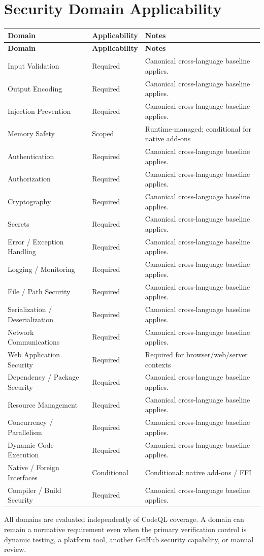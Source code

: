 \documentclass[10pt,letterpaper]{article}
\begin{document}
\section{Security Domain Applicability}
\small
\setlength{\tabcolsep}{3pt}
\begin{longtable}{@{}P{1.8in}P{0.85in}P{3.75in}@{}}
\toprule
\textbf{Domain} & \textbf{Applicability} & \textbf{Notes}\\
\midrule
\endfirsthead
\toprule
\textbf{Domain} & \textbf{Applicability} & \textbf{Notes}\\
\midrule
\endhead
Input Validation & Required & Canonical cross-language baseline applies.\\
Output Encoding & Required & Canonical cross-language baseline applies.\\
Injection Prevention & Required & Canonical cross-language baseline applies.\\
Memory Safety & Scoped & Runtime-managed; conditional for native add-ons\\
Authentication & Required & Canonical cross-language baseline applies.\\
Authorization & Required & Canonical cross-language baseline applies.\\
Cryptography & Required & Canonical cross-language baseline applies.\\
Secrets & Required & Canonical cross-language baseline applies.\\
Error / Exception Handling & Required & Canonical cross-language baseline applies.\\
Logging / Monitoring & Required & Canonical cross-language baseline applies.\\
File / Path Security & Required & Canonical cross-language baseline applies.\\
Serialization / Deserialization & Required & Canonical cross-language baseline applies.\\
Network Communications & Required & Canonical cross-language baseline applies.\\
Web Application Security & Required & Required for browser/web/server contexts\\
Dependency / Package Security & Required & Canonical cross-language baseline applies.\\
Resource Management & Required & Canonical cross-language baseline applies.\\
Concurrency / Parallelism & Required & Canonical cross-language baseline applies.\\
Dynamic Code Execution & Required & Canonical cross-language baseline applies.\\
Native / Foreign Interfaces & Conditional & Conditional: native add-ons / FFI\\
Compiler / Build Security & Required & Canonical cross-language baseline applies.\\
\bottomrule
\end{longtable}
\normalsize
All domains are evaluated independently of CodeQL coverage. A domain can remain a normative requirement even when the primary verification control is dynamic testing, a platform tool, another GitHub security capability, or manual review.
\end{document}
